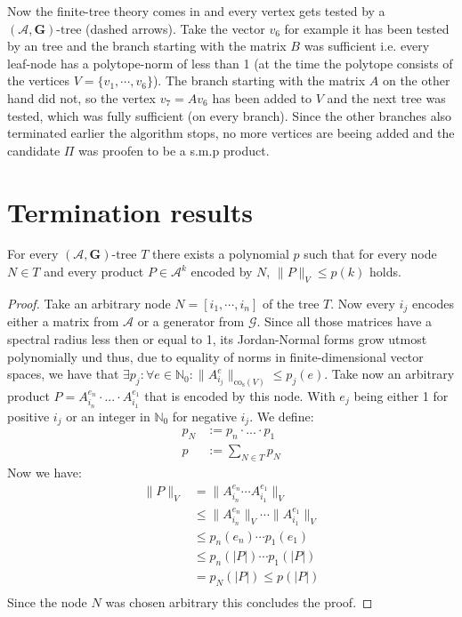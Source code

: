 Now the finite-tree theory comes in and every vertex gets tested by a $(\mathcal{A},\mathbf{G})\text{-tree}$ (dashed arrows). Take the vector $v_6$ for example it has been tested by an tree and the branch starting with the matrix $B$ was sufficient i.e. every leaf-node has a polytope-norm of less than 1 (at the time the polytope consists of the vertices $V = \{v_1, \cdots, v_6\}$). The branch starting with the matrix $A$ on the other hand did not, so the vertex $v_7 = Av_6$ has been added to $V$ and the next tree was tested, which was fully sufficient (on every branch). Since the other branches also terminated earlier the algorithm stops, no more vertices are beeing added and the candidate $\Pi$ was proofen to be a s.m.p product. 

\section{Termination results}

\begin{lemma}
  \label{lem:poly}
  For every $(\mathcal{A},\mathbf{G})\text{-tree } T$ there exists a polynomial $p$ such that for every node $N \in T$ and every product $P \in \mathcal{A}^k$ encoded by $N$, $\lVert P \rVert _V \le p(k)$ holds.
\end{lemma}

\begin{proof}
  Take an arbitrary node $N = [i_1, \cdots, i_n]$ of the tree $T$. 
  Now every $i_j$ encodes either a matrix from $\mathcal{A}$ or a generator from $\mathcal{G}$. 
  Since all those matrices have a spectral radius less then or equal to 1, its Jordan-Normal forms grow utmost polynomially und thus, due to equality of norms in finite-dimensional vector spaces, we have that $ \exists p_j: \forall e \in \mathbb{N}_0: \lVert A_{i_j}^{e} \rVert _{\text{co}_{\text{s}}(V)} \le p_j(e)$.
  Take now an arbitrary product $P = A_{i_n}^{e_{n}}\cdot...\cdot A_{i_1}^{e_{1}}$ that is encoded by this node. 
  With $e_j$ being either 1 for positive $i_j$ or an integer in $\mathbb{N}_0$ for negative $i_j$.
  We define: 
  $$
  \begin{aligned}
  p_N & := p_{n} \cdot ... \cdot p_{1} \\
  p & := \sum \limits_{N \in T} p_N
  \end{aligned}
  $$
  Now we have: 
  $$
  \begin{aligned}
  \lVert P \rVert _V & = \lVert A_{i_n}^{e_{n}} \cdots A_{i_1}^{e_{1}} \rVert _V \\
  & \leq \lVert A_{i_n}^{e_{n}} \rVert _V \cdots \lVert A_{i_1}^{e_{1}} \rVert _V \\
  & \leq p_{n}(e_n) \cdots p_{1}(e_1) \\
  & \leq p_{n}(\lvert P \rvert) \cdots p_{1}(\lvert P \rvert) \\
  & = p_N(\lvert P \rvert) \leq p(\lvert P \rvert) \\
  \end{aligned}
  $$
  Since the node $N$ was chosen arbitrary this concludes the proof. 
\end{proof}

